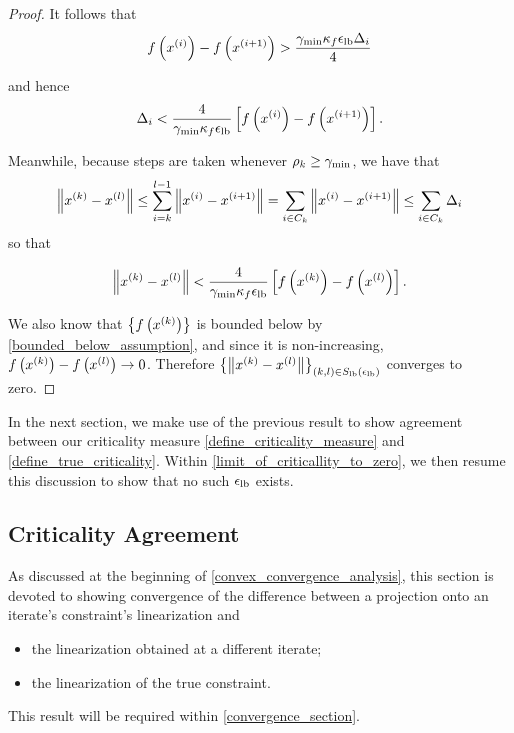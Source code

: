 \begin{proof}
It follows that
\begin{align*}
f\left(x^{(i)}\right) - f\left(x^{(i+1)}\right) > \frac{\gamma_{\textrm{min}} \kappa_f {\epsilon_{\textrm{lb}}} \Delta_i}{4}
\end{align*}

and hence
\begin{align*}
\Delta_i < \frac{4}{\gamma_{\textrm{min}} \kappa_f {\epsilon_{\textrm{lb}}}} \left[ f\left(x^{(i)}\right) - f\left(x^{(i+1)}\right)\right].
\end{align*}

Meanwhile, because steps are taken whenever $\rho_k \ge \gamma_{\textrm{min}}$, we have that
\begin{align*}
\left\|x^{(k)} - {x^{(l)}}\right\| \le \sum_{i = k}^{l-1}\left\|x^{(i)} - x^{(i+1)}\right\| = \sum_{i \in C_k}\left\|x^{(i)} - x^{(i+1)}\right\| \le \sum_{i \in C_k} \Delta_i
\end{align*}
so that

\begin{align}
\left\|x^{(k)} - {x^{(l)}}\right\| < \frac{4}{\gamma_{\textrm{min}} \kappa_f {\epsilon_{\textrm{lb}}}} \left[ f\left(x^{(k)}\right) - f\left({x^{(l)}}\right)\right].
\end{align}


We also know that $\left\{f\left(x^{(k)}\right)\right\}$ is bounded below by \cref{bounded_below_assumption}, 
and since it is non-increasing, $f\left(x^{(k)}\right)  - f\left({x^{(l)}}\right) \to 0$.
Therefore $\left\{\left\|x^{(k)} - {x^{(l)}}\right\|\right\}_{(k,l) \in {S_{\textrm{lb}}\left(\epsilon_{\textrm{lb}}\right)}}$ converges to zero.
\end{proof}

In the next section, we make use of the previous result to show agreement between our criticality measure
\cref{define_criticality_measure} and \cref{define_true_criticality}.
Within \cref{limit_of_criticallity_to_zero}, we then resume this discussion to show that no such ${\epsilon_{\textrm{lb}}}$ exists.


\subsection{Criticality Agreement}
\label{bounding_the_projection_section}
As discussed at the beginning of \cref{convex_convergence_analysis}, this section is devoted to showing convergence of the difference
between a projection onto an iterate's constraint's linearization and
\begin{itemize}
\item the linearization obtained at a different iterate; 
\item the linearization of the true constraint.
\end{itemize}
This result will be required within \cref{convergence_section}.


